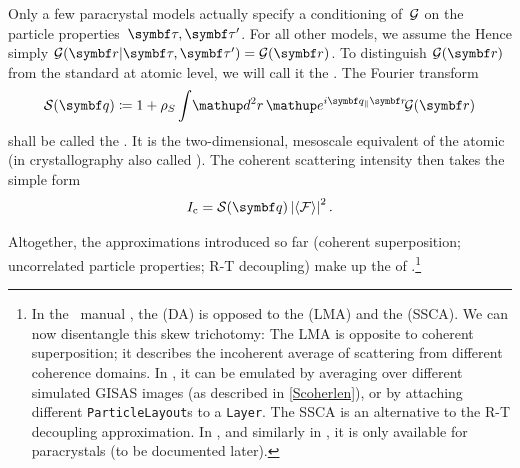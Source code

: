 Only a few paracrystal models actually specify
a conditioning of~$\mathcal{G}$ on the particle properties~$\v\tau,\v\tau'$.
For all other models, we assume the
Hence simply $\GD(\r|\v\tau,\v\tau')=\GD(\r)$.
To distinguish $\GD(\r)$ from the standard 
%
at atomic level, we will call it the
.
%
The Fourier transform
\begin{equation}
  \SD(\q)\coloneqq 1 + \rho_S \int\!\d^2r\,   \e^{i\q_{\plll}\r}\!   \GD(\r)
\end{equation}
shall be called the .
It is the two-dimensional, mesoscale equivalent of
the atomic 
%
(in crystallography also called ).
%
The coherent scattering intensity then takes the simple form
\Emph
{\begin{equation}
  I_\text{c} = \SD(\q) \left|\bra\FD\ket\right|^2.
\end{equation}\vskip -5pt}

Altogether, the approximations introduced so far
(coherent superposition; uncorrelated particle properties;
R-T decoupling)
make up the 
of \IsGISAXS.\footnote
{In the \IsGISAXS\ manual \cite[Sec.~2.2]{Laz08},
the  (DA)
%
%
is opposed to the
 (LMA)
%
%
and the
 (SSCA).
%
%
We can now disentangle this skew trichotomy:
The LMA is opposite to coherent superposition;
it describes the incoherent average of
scattering from different coherence domains.
In \BornAgain,
it can be emulated by averaging over different simulated GISAS images
(as described in \cref{Scoherlen}),
or by attaching different \texttt{ParticleLayout}s to a \texttt{Layer}.
The SSCA is an alternative to the R-T decoupling approximation.
In \IsGISAXS, and similarly in \BornAgain,
it is only available for paracrystals
(to be documented later).
}

